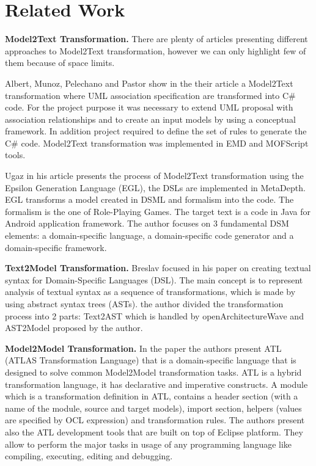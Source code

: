 \section{Related Work}
\label{relatedwork}

\textbf{Model2Text Transformation.} There are plenty of articles presenting different approaches to Model2Text transformation, however we can only highlight few of them because of space limits.

Albert, Munoz, Pelechano and Pastor show in the their article \cite{manoli} a Model2Text transformation where UML association specification are transformed into C\# code. For the project purpose it was necessary to extend UML proposal with association relationships and to create an input models by using a conceptual framework. In addition project required to define the set of rules to generate the C\# code. Model2Text transformation was implemented in EMD and MOFScript tools.

Ugaz in his article \cite{ugaz} presents the process of Model2Text transformation using the Epsilon Generation Language (EGL), the DSLs are implemented in MetaDepth. EGL transforms a model created in DSML and formalism into the code. The formalism is the one of Role-Playing Games. The target text is a code in Java for Android application framework. The author focuses on 3 fundamental DSM elements: a domain-specific language, a domain-specific code generator and a domain-specific framework.


\textbf{Text2Model Transformation.} Breslav focused in his paper \cite{breslav} on creating textual syntax for Domain-Specific Languages (DSL). The main concept is to represent analysis of textual syntax as a sequence of transformations, which is made by using abstract syntax trees (ASTs). the author divided the transformation process into 2 parts: Text2AST which is handled by openArchitectureWave and AST2Model proposed by the author.

\textbf{Model2Model Transformation.} In the paper \cite{atl} the authors present ATL (ATLAS Transformation Language) that is a domain-specific language that is designed to solve common Model2Model transformation tasks. ATL is a hybrid transformation language, it has declarative and imperative constructs. A module which is a transformation definition in ATL, contains a header section (with a name of the module, source and target models), import section, helpers (values are specified by OCL expression) and transformation rules. The authors present also the ATL development tools that are built on top of Eclipse platform. They allow to perform the major tasks in usage of any programming language like compiling, executing, editing and debugging.


